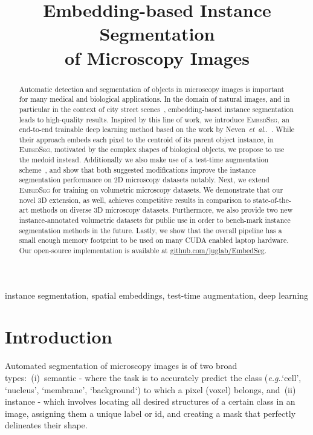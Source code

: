 \documentclass{midl} %
\title[Embedding-based Instance Segmentation of Microscopy Images]{Embedding-based Instance Segmentation \\of Microscopy Images}
\makeatletter
\newcommand{\EmbedSeg}{\mbox{\textsc{EmbedSeg}}\xspace}
\DeclareRobustCommand\onedot{\futurelet\@let@token\@onedot}
\def\@onedot{\ifx\@let@token.\else.\null\fi\xspace}
\def\eg{\emph{e.g}\onedot} \def\Eg{\emph{E.g}\onedot}
\def\etal{\emph{et~al}\onedot}
\makeatother
\begin{document}
\maketitle

\begin{abstract}
Automatic detection and segmentation of objects in microscopy images is important for many medical and biological applications.
In the domain of natural images, and in particular in the context of city street scenes~\cite{Cordts2016Cityscapes}, embedding-based instance segmentation leads to high-quality results.
Inspired by this line of work, we introduce \EmbedSeg, an end-to-end trainable deep learning method based on the work by Neven~\etal~\cite{neven2019}. 
While their approach embeds each pixel to the centroid of its parent object instance, in \EmbedSeg, motivated by the complex shapes of biological objects, we propose to use the medoid instead.
Additionally we also make use of a test-time augmentation scheme~\cite{wang2019}, and show that both suggested modifications improve the instance segmentation performance on 2D microscopy datasets notably.
Next, we extend \EmbedSeg for training on volumetric microscopy datasets. 
We demonstrate that our novel 3D extension, as well, achieves competitive results in comparison to state-of-the-art methods on diverse 3D microscopy datasets.
Furthermore, we also provide two new instance-annotated volumetric datasets for public use in order to bench-mark instance segmentation methods in the future.
Lastly, we show that the overall pipeline has a small enough memory footprint to be used on many CUDA enabled laptop hardware.
Our open-source implementation is available at \url{github.com/juglab/EmbedSeg}.
\end{abstract}

\begin{keywords}
instance segmentation, spatial embeddings, test-time augmentation, deep learning
\end{keywords}

\section{Introduction}

Automated segmentation of microscopy images is of two broad types:~(i)~semantic - where the task is to accurately predict the class (\eg `cell', `nucleus', `membrane', `background`) to which a pixel (voxel) belongs, and~(ii) instance - which involves locating all desired structures of a certain class  in an image, assigning them a unique label or id, and creating a mask that perfectly delineates their shape.
\end{document}
